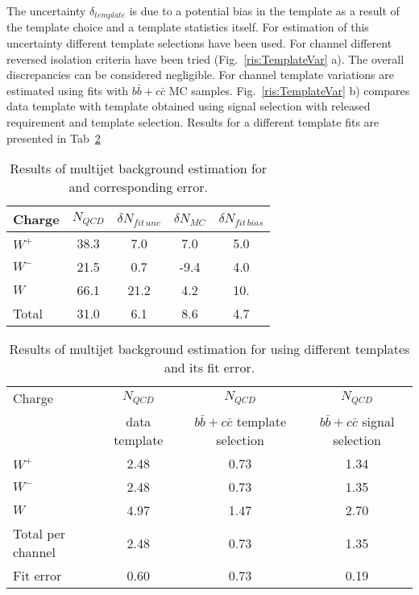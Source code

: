 The uncertainty $\delta_{template}$ is due to a potential bias in the template as a result of the template choice and a template statistics itself. For estimation of this uncertainty different template selections have been used. For \wenu channel different reversed isolation criteria have been tried (Fig.~\ref{ris:TemplateVar} a). The overall discrepancies can be considered negligible. For \wmunu channel template variations are estimated using fits with $b\bar{b}+c\bar{c}$ MC samples.  Fig.~\ref{ris:TemplateVar} b) compares data template with template obtained using signal selection with released \mtw requirement and template selection. Results for a different template fits are presented in Tab~\ref{tab:QCDWmunu}

\begin{table}[!tbp]
    \caption{Results of multijet background estimation for \wenu and corresponding error.}
	\label{tab:QCDWenu}
	\begin{center}
		\begin{tabular}{l | c | c | c | c }
		\hline
		    Charge & $N_{QCD}$ & $ \delta N_{fit\, unc} $ & $\delta N_{MC}$ & $\delta N_{fit\, bias}$ \\
		    \hline
		    $W^{+}$ & 38.3 & 7.0 & 7.0 & 5.0 \\
		    $W^{-} $ & 21.5 & 0.7 &  -9.4 & 4.0 \\
		    $W$ & 66.1 & 21.2 & 4.2 & 10.  \\
		    \hline
		    \hline
		    Total & 31.0 & 6.1 & 8.6 & 4.7 \\
		    \hline
		\end{tabular}
	\end{center}
\end{table}

\begin{table}[!tbp]
    \caption{Results of multijet background estimation for \wmunu using different templates and its fit error.}
	\label{tab:QCDWmunu}
	\begin{center}
		\begin{tabular}{l | c | c | c  }
		\hline
		    Charge & $N_{QCD}$ & $N_{QCD}$ & $N_{QCD}$ \\
		    & data template & $b\bar{b}+c\bar{c}$ template selection & $b\bar{b}+c\bar{c}$ signal selection \\
		    \hline
		    $W^{+}$ & 2.48 & 0.73 & 1.34 \\
		    $W^{-} $ & 2.48 & 0.73 & 1.35 \\
		    $W$ & 4.97 & 1.47 & 2.70  \\
		    \hline
		    \hline
		    Total per channel & 2.48 & 0.73 & 1.35 \\
		    Fit error & 0.60 & 0.73 & 0.19 \\
		    \hline
		\end{tabular}
	\end{center}
\end{table}


